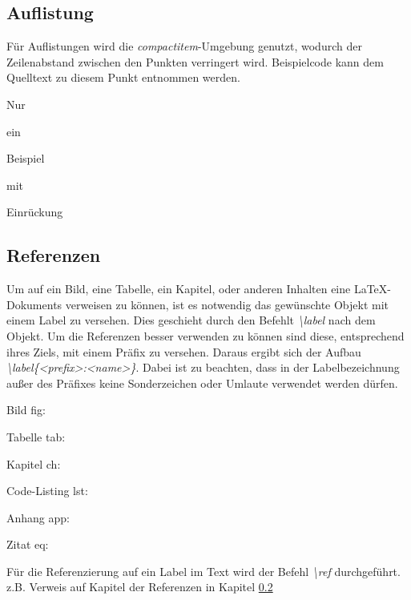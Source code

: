 \documentclass[12pt,a4paper, listof=entryprefix, bibliography=totocnumbered,toc=listofnumbered,lof=listofnumbered]{scrartcl}
\begin{document}
\subsection{Auflistung}

Für Auflistungen wird die \textit{compactitem}-Umgebung genutzt, wodurch der Zeilenabstand zwischen den Punkten verringert wird. Beispielcode kann dem Quelltext zu diesem Punkt entnommen werden.

\begin{compactitem}
	\item Nur
	\item ein
	\item Beispiel
	\begin{compactitem}
		\item mit
		\item Einrückung
	\end{compactitem}
\end{compactitem}

\subsection{Referenzen}
\label{ch:referenz}
Um auf ein Bild, eine Tabelle, ein Kapitel, oder anderen Inhalten eine \LaTeX-Dokuments verweisen zu können, ist es notwendig das gewünschte Objekt mit einem Label zu versehen. Dies geschieht durch den Befehlt \textit{\textbackslash label} nach dem Objekt. Um die Referenzen besser verwenden zu können sind diese, entsprechend ihres Ziels, mit einem Präfix zu versehen. Daraus ergibt sich der Aufbau \textit{\textbackslash label\{\textless prefix\textgreater:\textless name\textgreater\}}. Dabei ist zu beachten, dass in der Labelbezeichnung außer des Präfixes keine Sonderzeichen oder Umlaute verwendet werden dürfen.

\begin{compactitem}
	\item Bild fig:
	\item Tabelle tab:
	\item Kapitel ch:
	\item Code-Listing lst:
	\item Anhang app:
	\item Zitat eq:
\end{compactitem}

Für die Referenzierung auf ein Label im Text wird der Befehl \textit{\textbackslash ref} durchgeführt.\\
z.B. Verweis auf Kapitel der Referenzen in Kapitel \ref{ch:referenz}
\end{document}
